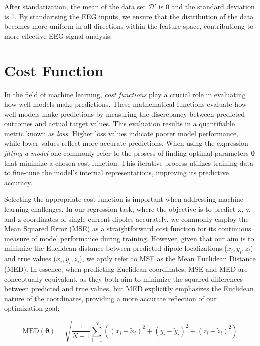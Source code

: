 \documentclass[a4paper, UKenglish, 11pt]{uiomaster}
\begin{document}
After standarization, the mean of the data set $\mathcal{D}'$  is 0 and the standard deviation is 1. By standarising the EEG inputs, we ensure that the distribution of the data becomes more uniform in all directions within the feature space, contributiong to more effective EEG signal analysis.


\section{Cost Function}
In the field of machine learning, \emph{cost functions} play a crucial role in evaluating how well models make predictions. These mathematical functions evaluate how well models make predictions by measuring the discrepancy between predicted outcomes and actual target values. This evaluation results in a quantifiable metric known as \emph{loss}. Higher loss values indicate poorer model performance, while lower values reflect more accurate predictions. When using the expression \emph{fitting a model} one commonly refer to the prosess of finding optimal parameters $\boldsymbol{\theta}$ that minimize a chosen cost function. This iterative process utilizes training data to fine-tune the model's internal representations, improving its predictive accuracy.


Selecting the appropriate cost function is important when addressing machine learning challenges. In our regression task, where the objective is to predict x, y, and z coordinates of single current dipoles accurately, we commonly employ the Mean Squared Error (MSE) as a straightforward cost function for its continuous measure of model performance during training. However, given that our aim is to minimize the Euclidean distance between predicted dipole localizations (${x_i, y_i, z_i}$) and true values ($\tilde{x}_i, \tilde{y}_i, \tilde{z}_i$), we aptly refer to MSE as the Mean Euclidean Distance (MED). In essence, when predicting Euclidean coordinates, MSE and MED are conceptually equivalent, as they both aim to minimize the squared differences between predicted and true values, but MED explicitly emphasizes the Euclidean nature of the coordinates, providing a more accurate reflection of our optimization goal:

\begin{equation}
\text{MED}(\boldsymbol{\theta}) = \sqrt{\frac{1}{N-1} \sum_{i=1}^{N} \left((x_i - \tilde{x}_i)^2 + (y_i - \tilde{y}_i)^2 + (z_i - \tilde{z}_i)^2\right)}
\label{eq:MED}
\end{equation}
%
\end{document}
